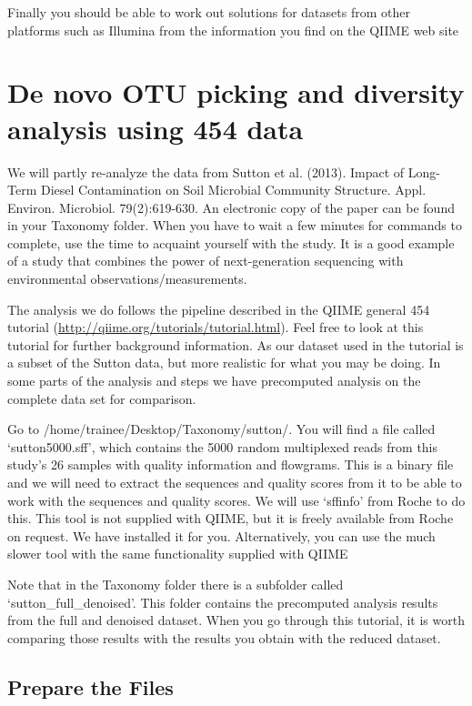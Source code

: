 Finally you should be able to work out solutions for datasets from other platforms such as Illumina from the information you find on the QIIME web site

\section{De novo OTU picking and diversity analysis using 454 data}

We will partly re-analyze the data from Sutton et al. (2013). Impact of Long-Term Diesel Contamination on Soil Microbial Community Structure. Appl. Environ. Microbiol. 79(2):619-630. An electronic copy of the paper can be found in your Taxonomy folder. When you have to wait a few minutes for commands to complete, use the time to acquaint yourself with the study. It is a good example of a study that combines the power of next-generation sequencing with environmental observations/measurements.

The analysis we do follows the pipeline described in the QIIME general 454 tutorial (\url{http://qiime.org/tutorials/tutorial.html}). Feel free to look at this tutorial for further background information. As our dataset used in the tutorial is a subset of the Sutton data, but more realistic for what you may be doing. In some parts of the analysis and steps we have precomputed analysis on the complete data set for comparison.

Go to /home/trainee/Desktop/Taxonomy/sutton/. You will find a file called ‘sutton5000.sff’, which contains the 5000 random multiplexed reads from this study’s 26 samples with quality information and flowgrams. This is a binary file and we will need to extract the sequences and quality scores from it to be able to work with the sequences and quality scores. We will use ‘sffinfo’ from Roche to do this. This tool is not supplied with QIIME, but it is freely available from Roche on request. We have installed it for you. Alternatively, you can use the much slower tool with the same functionality supplied with QIIME

Note that in the Taxonomy folder there is a subfolder called ‘sutton_full_denoised’. This folder contains the precomputed analysis results from the full and denoised dataset. When you go through this tutorial, it is worth comparing those results with the results you obtain with the reduced dataset. 

\subsection{Prepare the Files}


